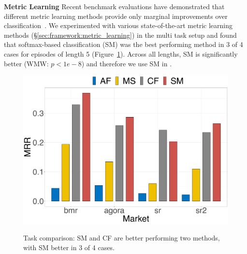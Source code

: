 \noindent \textbf{Metric Learning}
Recent benchmark evaluations have demonstrated that different metric learning methods provide only marginal improvements over classification~\cite{musgrave2020metric,Zhai2019ClassificationIA}. 
We experimented with various state-of-the-art metric learning methods (\S\ref{sec:framework:metric_learning}) in the multi task setup and found that softmax-based classification (SM) was the best performing method in 3 of 4 cases for episodes of length 5 (Figure~\ref{fig:metric_learning}). 
Across all lengths, SM is significantly better (WMW: $p < 1e-8$) and therefore we use SM in \SYSMLmethodname{}.

\begin{figure}[!htbp]
    \centering
    \includegraphics[width=0.8\linewidth,alt={Bar chart showing comparison of metric learning approaches.}]{sysml/plots/nce_comparison_multitask.png}
    \caption{Task comparison: SM and CF are better performing two methods, with SM better in 3 of 4 cases.}
    \label{fig:metric_learning}
\end{figure}



